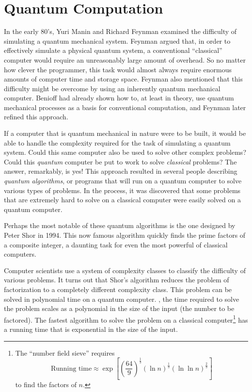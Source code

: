 
\chapter{Quantum Computation}
\label{chap:quantumComputation}
%

In the early 80's, 
Yuri Manin\cite{Manin:80} and Richard Feynman\cite{Feynman:82} examined 
the difficulty of simulating a quantum mechanical system.  
Feynman argued that, in order to effectively simulate a physical quantum 
system, a conventional ``classical'' computer would require an unreasonably 
large amount of overhead.  So no matter how clever the programmer, this
task would almost always require enormous amounts of computer time and storage
space.  Feynman also mentioned that this difficulty might be overcome
by using an inherently quantum mechanical computer.  
Benioff\cite{Benioff:80} had already shown how to, at least in theory, 
use quantum mechanical processes as a basis for conventional computation,
and Feynman\cite{Feynman:85} later refined this approach.

If a computer that is quantum mechanical in nature were to be built,
it would be able to handle the complexity required for the task of simulating
a quantum system.  Could this same computer also be used to solve other complex
problems?  Could this {\sl quantum} computer be put to work to solve 
{\sl classical} problems?  The answer, remarkably,  is yes!
This approach resulted in several 
people\cite{Deutsch:85a,Deutsch:85b,Deutsch/Jozsa:92,Bernstein/Vazirani:97,
Simon:97,Shor:94,Grover:96a}
describing \emph{quantum algorithms}, or programs that will run on a quantum
computer to solve various types of problems.
In the process, it was discovered that some problems that are extremely hard
to solve on a classical computer were easily solved on a quantum computer.

Perhaps the most notable of these quantum algorithms is the one designed by 
Peter Shor\cite{Shor:94} in 1994.  This now famous algorithm quickly finds the 
prime factors of a composite integer, a daunting task for even the most
powerful of classical computers.  

Computer scientists use a system of
complexity classes to classify the difficulty of various problems.
It turns out that Shor's algorithm reduces the problem of factorization
to a completely different complexity class.  This problem can be solved
in polynomial time on a quantum computer.  \ie, the time required to solve
the problem scales as a polynomial in the size of the input (the number to
be factored).  The fastest algorithm to solve the problem on a classical
computer\footnote{The ``number field sieve'' requires 
\begin{equation}
\text{Running time} \approx \exp\left[ \left(\frac{64}{9}\right)^{\frac{1}{3}}
\left(\ln n\right)^{\frac{1}{3}}
\left(\ln \ln n\right)^{\frac{2}{3}}
\right]
\end{equation}
to find the factors of $n$.} 
has a running time that is exponential in the size of the input.

